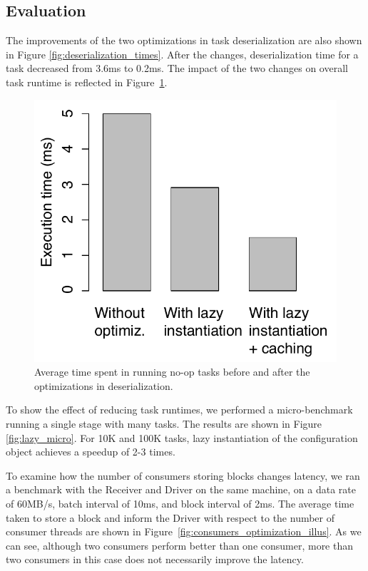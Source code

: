 \subsection{Evaluation}
The improvements of the two optimizations in task deserialization are also shown in Figure \ref{fig:deserialization_times}. After the changes, deserialization time for a task decreased from 3.6ms to 0.2ms. The impact of the two changes on overall task runtime is reflected in Figure~\ref{fig:runtime_optimizations}.

\begin{figure}[t!]
 \begin{center}
   \includegraphics[scale=0.60]{images_graphs/optimizations/graph3/runtime_optimizations.pdf}
 \end{center}
 \caption{Average time spent in running no-op tasks before and after the optimizations in deserialization.}
 \label{fig:runtime_optimizations}
\end{figure}

To show the effect of reducing task runtimes, we performed a micro-benchmark running a single stage with many tasks. The results are shown in Figure \ref{fig:lazy_micro}. For 10K and 100K tasks, lazy instantiation of the configuration object achieves a speedup of 2-3 times.

To examine how the number of consumers storing blocks changes latency, we ran a benchmark with the Receiver and Driver on the same machine, on a data rate of 60MB/s, batch interval of 10ms, and block interval of 2ms. The average time taken to store a block and inform the Driver with respect to the number of consumer threads are shown in Figure~\ref{fig:consumers_optimization_illus}. As we can see, although two consumers perform better than one consumer, more than two consumers in this case does not necessarily improve the latency.


